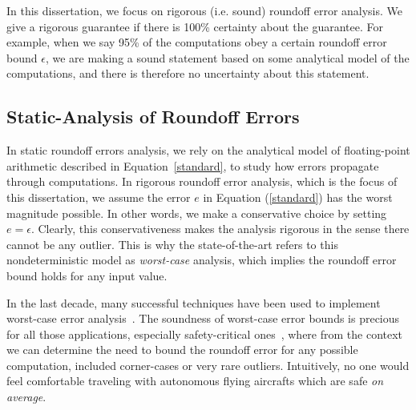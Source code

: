 In this dissertation, we focus on rigorous (i.e. sound) roundoff error analysis.
%
We give a rigorous guarantee if there is 100\% certainty about the guarantee.
%
%
For example, when we say 95\% of the computations obey a certain roundoff error bound $\epsilon$, we are making a sound statement based on some analytical model of the computations, and there is therefore no uncertainty about this statement.
%
%
\subsection{Static-Analysis of Roundoff Errors}
\label{sec:worst}
%
In static roundoff errors analysis, we rely on the analytical model of floating-point arithmetic described in Equation~\ref{standard}, to study how errors propagate through computations.
%
In rigorous roundoff error analysis, which is the focus of this dissertation, we assume the error $e$ in Equation (\ref{standard}) has the worst magnitude possible. In other words, we make a conservative choice by setting $e=\epsilon$.
%
Clearly, this conservativeness makes the analysis rigorous in the sense there cannot be any outlier.
%
This is why the state-of-the-art refers to this nondeterministic model as \emph{worst-case} analysis, which implies the roundoff error bound holds for any input value.
%

In the last decade, many successful techniques have been used to implement worst-case error analysis~\cite{darulova2018daisy,2015_fm_sjrg,solovyev2018rigorous,rosa,fptuner,smartfloat,satire,gappa,fluctuat}.
%
%
The soundness of worst-case error bounds is precious for all those applications, especially safety-critical ones~\cite{guardstable, cpralg}, where from the context we can determine the need to bound the roundoff error for any possible computation, included corner-cases or very rare outliers.
%
Intuitively, no one would feel comfortable traveling with autonomous flying aircrafts which are safe \emph{on average}.

